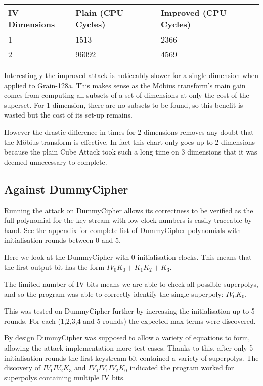\documentclass{report}
\let\Oldsubsection\subsection
\renewcommand{\subsection}{\FloatBarrier\Oldsubsection}
\begin{document}
\begin{center}
    \begin{tabular}{| l | l | l |}
    \hline
    IV Dimensions & Plain (CPU Cycles) & Improved (CPU Cycles)\\ \hline
    1 & 1513 & 2366\\ \hline
    2 & 96092 & 4569\\ \hline
    \end{tabular}
\end{center}
Interestingly the improved attack is noticeably slower for a single dimension when applied to Grain-128a. This makes sense as the M\"{o}bius transform's main gain comes from computing all subsets of a set of dimensions at only the cost of the superset. For 1 dimension, there are no subsets to be found, so this benefit is wasted but the cost of its set-up remains.

However the drastic difference in times for 2 dimensions removes any doubt that the M\"{o}bius transform is effective. In fact this chart only goes up to 2 dimensions because the plain Cube Attack took such a long time on 3 dimensions that it was deemed unnecessary to complete.
\subsection{Against DummyCipher}
Running the attack on DummyCipher allows its correctness to be verified as the full polynomial for the key stream with low clock numbers is easily traceable by hand. See the appendix for complete list of DummyCipher polynomials with initialisation rounds between 0 and 5.

Here we look at the DummyCipher with 0 initialisation clocks. This means that the first output bit has the form $IV_0K_0+K_1K_2+K_3$.

The limited number of IV bits means we are able to check all possible superpolys, and so the program was able to correctly identify the single superpoly: $IV_0K_0$.

This was tested on DummyCipher further by increasing the initialisation up to 5 rounds. For each (1,2,3,4 and 5 rounds) the expected max terms were discovered.

By design DummyCipher was supposed to allow a variety of equations to form, allowing the attack implementation more test cases. Thanks to this, after only 5 initialisation rounds the first keystream bit contained a variety of superpolys. The discovery of $IV_1IV_2K_3$ and $IV_0IV_1IV_2K_0$ indicated the program worked for superpolys containing multiple IV bits.
\end{document}
